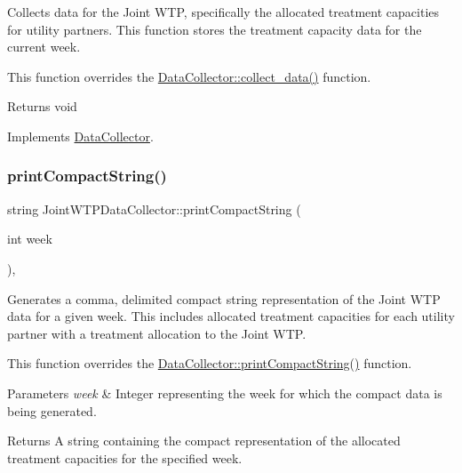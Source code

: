 Collects data for the Joint W\+TP, specifically the allocated treatment capacities for utility partners. This function stores the treatment capacity data for the current week. 

This function overrides the \mbox{\hyperlink{classDataCollector_a01486bf58acbe37b203f97b3b9a79c40}{Data\+Collector\+::collect\+\_\+data()}} function.

\begin{DoxyReturn}{Returns}
void 
\end{DoxyReturn}


Implements \mbox{\hyperlink{classDataCollector_a01486bf58acbe37b203f97b3b9a79c40}{Data\+Collector}}.

\mbox{\label{classJointWTPDataCollector_aadb9fb969b265c72555bb5a7d3ed945d}} 
\subsubsection{\texorpdfstring{print\+Compact\+String()}{printCompactString()}}
{\footnotesize\ttfamily string Joint\+W\+T\+P\+Data\+Collector\+::print\+Compact\+String (\begin{DoxyParamCaption}\item[{int}]{week }\end{DoxyParamCaption})\hspace{0.3cm}{\ttfamily [override]}, {\ttfamily [virtual]}}



Generates a comma, delimited compact string representation of the Joint W\+TP data for a given week. This includes allocated treatment capacities for each utility partner with a treatment allocation to the Joint W\+TP. 

This function overrides the \mbox{\hyperlink{classDataCollector_a2eac264fa5612aed5a830b12de4f4ae3}{Data\+Collector\+::print\+Compact\+String()}} function.


\begin{DoxyParams}{Parameters}
{\em week} & Integer representing the week for which the compact data is being generated.\\
\hline
\end{DoxyParams}
\begin{DoxyReturn}{Returns}
A string containing the compact representation of the allocated treatment capacities for the specified week. 
\end{DoxyReturn}


